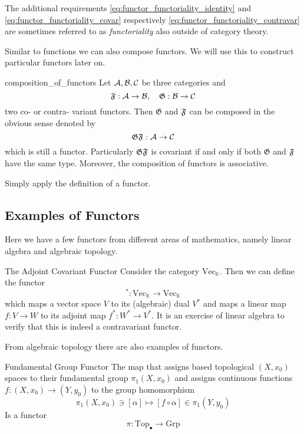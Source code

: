The additional requirements \ref{eq:functor_functoriality_identity} and \ref{eq:functor_functoriality_covar} respectively \ref{eq:functor_functoriality_contravar} are sometimes referred to as \emph{functoriality} also outside of category theory.

Similar to functions we can also compose functors. We will use this to construct particular functors later on.

\begin{defprop}{\cite[Section~1.3.1]{Roman2017}}{composition_of_functors}
Let $\mathcal{A}, \mathcal{B}, \mathcal{C}$ be three categories and
$$
\mathfrak{F}: \mathcal{A} \to \mathcal{B}, \quad \mathfrak{G}: \mathcal{B} \to \mathcal{C}
$$
two co- or contra- variant functors. Then $\mathfrak{G}$ and $\mathfrak{F}$ can be composed in the obvious sense denoted by
$$\mathfrak{G} \mathfrak{F}: \mathcal{A} \to \mathcal{C}$$
which is still a functor. Particularly $\mathfrak{G} \mathfrak{F}$ is covariant if and only if both $\mathfrak{G}$ and $\mathfrak{F}$ have the same type. Moreover, the composition of functors is associative.
\end{defprop}
\begin{proofidea}
Simply apply the definition of a functor.
\end{proofidea}

\subsection{Examples of Functors}

Here we have a few functors from different areas of mathematics, namely linear algebra and algebraic topology.

\begin{example}{The Adjoint Covariant Functor}{}
Consider the category $\mathrm{Vec}_\mathbb{K}$. Then we can define the functor
$$
^* : \mathrm{Vec}_\mathbb{K} \to \mathrm{Vec}_\mathbb{K}
$$
which maps a vector space $V$ to its (algebraic) dual $V^*$ and maps a linear map $f: V \to W$ to its adjoint map $f^*: W^* \to V^*$. It is an exercise of linear algebra to verify that this is indeed a contravariant functor.
\end{example}

From algebraic topology there are also examples of functors.
\begin{example}{Fundamental Group Functor}{}
\cite{Hatcher2001}
The map that assigns based topological $(X,x_0)$ spaces to their fundamental group $\pi_1(X,x_0)$ and assigns continuous functions $f: (X,x_0) \to (Y,y_0)$ to the group homomorphism 
$$
\pi_1(X,x_0) \ni [\alpha] \mapsto [f \circ \alpha] \in \pi_1(Y,y_0)
$$
Is a functor
$$
\pi: \mathrm{Top}_\bullet \to \mathrm{Grp}
$$
\end{example}

